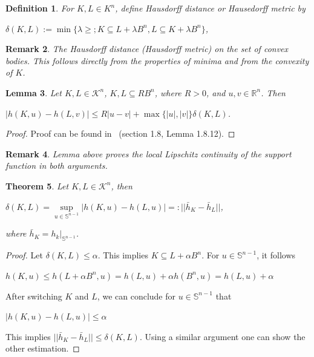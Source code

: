 \documentclass[a4paper]{book}
\newtheorem{theorem}{Theorem}%
\newtheorem{lemma}[theorem]{Lemma}%
\newtheorem{remark}[theorem]{Remark}%
\newtheorem{definition}[theorem]{Definition}%
\numberwithin{theorem}{section}%
\begin{document}
\begin{definition}
    For $K,L\in K^{n}$, define Hausdorff distance or Hausedorff metric by
    \begin{center}
        $\delta(K,L):=\min\{\lambda\geq;K\subseteq L+\lambda B^{n},L\subseteq K+\lambda B^{n}\}$,
    \end{center}
\end{definition}

\begin{remark}
    The Hausdorff distance (Hausdorff metric) on the set of convex bodies. This follows directly from the properties of minima and from the convexity of $K$.
\end{remark}

\begin{lemma}
    Let $K,L\in\mathscr{K}^{n}$, $K,L\subseteq RB^{n}$, where $R>0$, and $u,v\in\mathbb{R}^{n}$. Then
    \begin{center}
        $|h(K,u)-h(L,v)|\leq R|u-v|+\max\{|u|,|v|\}\delta(K,L)$.
    \end{center}
\end{lemma}
\begin{proof}
    Proof can be found in~\citep{schneider2014convex} (section 1.8, Lemma 1.8.12).
\end{proof}

\begin{remark}
    Lemma above proves the local Lipschitz continuity of the support function in both arguments.
\end{remark}

\begin{theorem}
    Let $K,L\in\mathscr{K}^{n}$, then
    \begin{center}
        $\delta(K,L)=\underset{u\in\mathbb{S}^{n-1}}{\sup}|h(K,u)-h(L,u)|=:||\bar{h}_{K}-\bar{h}_{L}||$,
    \end{center}
    where $\displaystyle \bar{h}_{K}=h_{k}|_{\mathbb{S}^{n-1}}$.
\end{theorem}
\begin{proof}
    Let $\delta(K,L)\leq\alpha$. This implies $K\subseteq L+\alpha B^{n}$. For $u\in\mathbb{S}^{n-1}$, it follows 
    \begin{center}
        $h(K,u)\leq h(L+\alpha B^{n},u)=h(L,u)+\alpha h(B^{n},u)=h(L,u)+\alpha$
    \end{center}
    After switching $K$ and $L$, we can conclude for $u\in\mathbb{S}^{n-1}$ that
    \begin{center}
        $|h(K,u)-h(L,u)|\leq\alpha$
    \end{center}
    This implies $||\bar{h}_{K}-\bar{h}_{L}||\leq\delta(K,L)$. Using a similar argument one can show the other estimation.
\end{proof}
\end{document}
